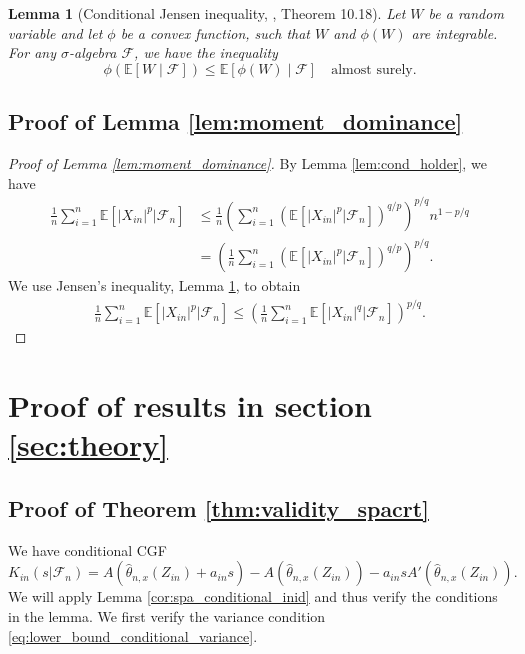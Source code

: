 \documentclass[12pt]{article}
\newtheorem{lemma}{Lemma}
\theoremstyle{definition}
\newcommand{\E}{\mathbb E}								%
\newcommand{\srz}{Z}									%
\begin{document}
\begin{lemma}[Conditional Jensen inequality, \cite{Davidson2003}, Theorem 10.18] \label{lem:conditional-jensen}
	Let $W$ be a random variable and let $\phi$ be a convex function, such that $W$ and $\phi(W)$ are integrable. For any $\sigma$-algebra $\mathcal F$, we have the inequality
	\begin{equation*}
		\phi(\E[W \mid \mathcal F]) \leq  \E[\phi(W) \mid \mathcal F] \quad \text{almost surely}.
	\end{equation*}
\end{lemma}

\subsection{Proof of Lemma \ref{lem:moment_dominance}}

\begin{proof}[Proof of Lemma \ref{lem:moment_dominance}]
  By Lemma \ref{lem:cond_holder}, we have
  \begin{align*}
    \frac{1}{n}\sum_{i=1}^n \E[|X_{in}|^{p}|\mathcal{F}_n]
    &
    \leq 
    \frac{1}{n}\left(\sum_{i=1}^n \left(\E[|X_{in}|^{p}|\mathcal{F}_n]\right)^{q/p}\right)^{p/q}n^{1-p/q}\\
    &
    =\left(\frac{1}{n}\sum_{i=1}^n \left(\E[|X_{in}|^{p}|\mathcal{F}_n]\right)^{q/p}\right)^{p/q}.
  \end{align*}
  We use Jensen's inequality, Lemma \ref{lem:conditional-jensen}, to obtain
  \begin{align*}
    \frac{1}{n}\sum_{i=1}^n \E[|X_{in}|^{p}|\mathcal{F}_n]\leq \left(\frac{1}{n}\sum_{i=1}^n \E[|X_{in}|^{q}|\mathcal{F}_n]\right)^{p/q}.
  \end{align*}
\end{proof}





\section{Proof of results in section \ref{sec:theory}}


\subsection{Proof of Theorem \ref{thm:validity_spacrt}}

We have conditional CGF 
\begin{equation}
K_{in}(s|\mathcal{F}_n) = A(\widehat \theta_{n,x}(\srz_{in})+a_{in}s)-A(\widehat \theta_{n,x}(\srz_{in}))-a_{in}sA'(\widehat \theta_{n,x}(\srz_{in})).
\end{equation}
We will apply Lemma \ref{cor:spa_conditional_inid} and thus verify the conditions in the lemma. We first verify the variance condition \eqref{eq:lower_bound_conditional_variance}.
\end{document}
